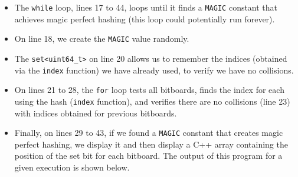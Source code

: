 \documentclass[12pt,a4paper,twoside,openright]{book}
\begin{document}
\begin{itemize}
\item The \texttt{while} loop, lines 17 to 44, loops until it finds a \texttt{MAGIC} constant that achieves magic perfect hashing (this loop could potentially run forever).

\item On line 18, we create the \texttt{MAGIC} value randomly.

\item The \texttt{set<uint64_t>} on line 20 allows us to remember the indices (obtained via the \texttt{index} function) we have already used, to verify we have no collisions.

\item On lines 21 to 28, the \texttt{for} loop tests all bitboards, finds the index for each using the hash (\texttt{index} function), and verifies there are no collisions (line 23) with indices obtained for previous bitboards.

\item Finally, on lines 29 to 43, if we found a \texttt{MAGIC} constant that creates magic perfect hashing, we display it and then display a C++ array containing the position of the set bit for each bitboard. The output of this program for a given execution is shown below. 


\end{itemize}
\end{document}

